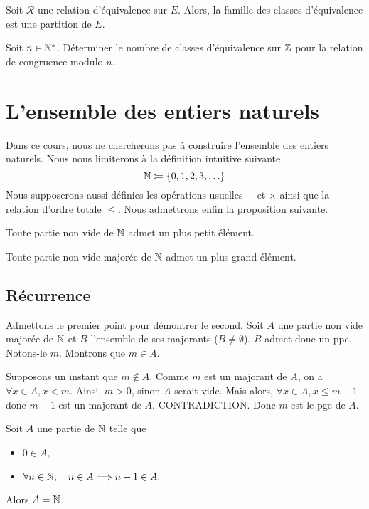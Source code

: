 \documentclass{magnolia}
\begin{document}
\begin{proposition}[utile=-3]
Soit $\mathcal{R}$ une relation d'équivalence sur $E$. Alors, la famille des
classes d'équivalence est une partition de $E$.
\end{proposition}

\begin{exoUnique}
\exo Soit $n\in{\mathbb{N}^*}$. Déterminer le nombre de classes d'équivalence sur $\mathbb{Z}$
  pour la relation de congruence modulo $n$.
\end{exoUnique}
  
  

\section{L'ensemble des entiers naturels}

Dans ce cours, nous ne chercherons pas à construire l'ensemble des entiers naturels.
Nous nous limiterons à la définition intuitive suivante.
\[\mathbb{N}\coloneqq\left\{0,1,2,3,\ldots\right\}\]
Nous supposerons aussi définies les opérations usuelles $+$ et $\times$ ainsi que la
relation d'ordre totale $\leq$. Nous admettrons enfin la proposition suivante.

\begin{proposition}[utile=-3]
Toute partie non vide de $\mathbb{N}$ admet un plus petit élément.
\end{proposition}
  
\begin{proposition}[utile=-3]
Toute partie non vide majorée de $\mathbb{N}$ admet un plus grand élément.
\end{proposition}

\subsection{Récurrence}


\begin{preuve}
Admettons le premier point pour démontrer le second. Soit $A$ une partie non vide majorée de $\mathbb{N}$ et $B$ l'ensemble de ses majorants ($B\neq \emptyset$). $B$ admet donc un ppe. Notons-le $m$. Montrons que $m\in A$.

Supposons un instant que $m\notin A$. Comme $m$ est un majorant de $A$, on a $\forall x \in A, x<m$. Ainsi, $m>0$, sinon $A$ serait vide. Mais alors, $\forall x \in A, x\leq m-1$ donc $m-1$ est un majorant de $A$. CONTRADICTION. Donc $m$ est le pge de $A$.
\end{preuve}

\begin{proposition}[utile=-3, nom={Principe de récurrence}]
Soit $A$ une partie de $\mathbb{N}$ telle que
\begin{itemize}
\item $0\in A$,
\item $\forall n\in\mathbb{N},\quad n\in A \Longrightarrow n+1 \in A.$
\end{itemize}
Alors $A=\mathbb{N}$.
\end{proposition}
\end{document}
